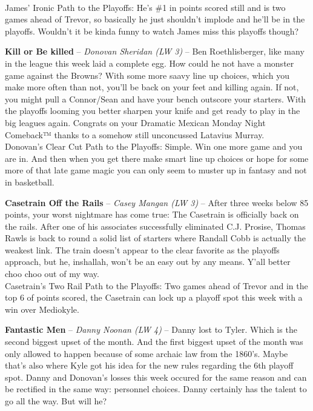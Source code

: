 \documentclass[11pt,letterpaper]{article}
\begin{document}
\begin{etaremune}
\medskip\\ James' Ironic Path to the Playoffs: He's \#1 in points scored still and is two games ahead of Trevor, so basically he just shouldn't implode and he'll be in the playoffs. Wouldn't it be kinda funny to watch James miss this playoffs though?
\newpage
\item \textbf{Kill or Be killed} -- \textit{Donovan Sheridan (LW 3)} -- Ben Roethlisberger, like many in the league this week laid a complete egg. How could he not have a monster game against the Browns? With some more saavy line up choices, which you make more often than not, you'll be back on your feet and killing again. If not, you might pull a Connor/Sean and have your bench outscore your starters. With the playoffs looming you better sharpen your knife and get ready to play in the big leagues again. Congrats on your Dramatic Mexican Monday Night Comeback™ thanks to a somehow still unconcussed Latavius Murray.
\medskip\\ Donovan's Clear Cut Path to the Playoffs: Simple. Win one more game and you are in. And then when you get there make smart line up choices or hope for some more of that late game magic you can only seem to muster up in fantasy and not in basketball. 
\item \textbf{Casetrain Off the Rails} -- \textit{Casey Mangan (LW 3)} -- After three weeks below 85 points, your worst nightmare has come true: The Casetrain is officially back on the rails. After one of his associates successfully eliminated C.J. Prosise, Thomas Rawls is back to round a solid list of starters where Randall Cobb is actually the weakest link. The train doesn't appear to the clear favorite as the playoffs approach, but he, inshallah, won't be an easy out by any means. Y'all better choo choo out of my way. 
\medskip\\ Casetrain's Two Rail Path to the Playoffs: Two games ahead of Trevor and in the top 6 of points scored, the Casetrain can lock up a playoff spot this week with a win over Mediokyle. 
\item \textbf{Fantastic Men} -- \textit{Danny Noonan (LW 4)} -- Danny lost to Tyler. Which is the second biggest upset of the month. And the first biggest upset of the month was only allowed to happen because of some archaic law from the 1860's. Maybe that's also where Kyle got his idea for the new rules regarding the 6th playoff spot. Danny and Donovan's losses this week occured for the same reason and can be rectified in the same way: personnel choices. Danny certainly has the talent to go all the way. But will he? 

\end{etaremune}
\end{document}
